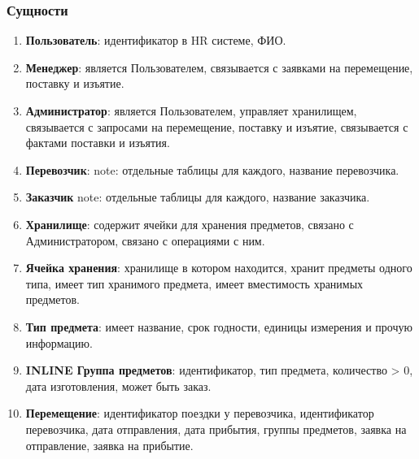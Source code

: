 
\subsubsection{Сущности}

\begin{enumerate}
  \item \textbf{Пользователь}: 
        идентификатор в HR системе, 
        ФИО.

  \item \textbf{Менеджер}: 
        является Пользователем, 
        связывается с заявками на перемещение,
        поставку и изъятие.

  \item \textbf{Администратор}:
        является Пользователем,
        управляет хранилищем,
        связывается с запросами на перемещение,
        поставку и изъятие,
        связывается с фактами поставки и изъятия.

  \item \textbf{Перевозчик}:
        note: отдельные таблицы для каждого,
        название перевозчика.

  \item \textbf{Заказчик}
        note: отдельные таблицы для каждого,
        название заказчика.

  \item \textbf{Хранилище}:
        содержит ячейки для хранения предметов,
        связано с Администратором,
        связано с операциями с ним.

  \item \textbf{Ячейка хранения}:
        хранилище в котором находится,
        хранит предметы одного типа,
        имеет тип хранимого предмета,
        имеет вместимость хранимых предметов.

  \item \textbf{Тип предмета}:
        имеет название,
        срок годности,
        единицы измерения 
        и прочую информацию.

  \item \textbf{INLINE Группа предметов}:
        идентификатор,
        тип предмета,
        количество > 0,
        дата изготовления,
        может быть заказ.

  \item \textbf{Перемещение}:
        идентификатор поездки у перевозчика,
        идентификатор перевозчика,
        дата отправления,
        дата прибытия,
        группы предметов,
        заявка на отправление,
        заявка на прибытие.


\end{enumerate}
